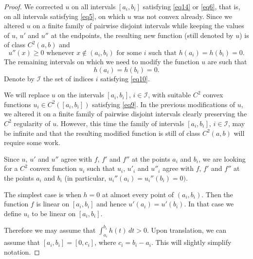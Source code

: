 \documentclass[intlimits,12pt,reqno]{amsart}
\theoremstyle{definition}
\begin{document}
\begin{proof}
We corrected $u$ on all intervals $[a_i,b_i]$ satisfying \eqref{eq14} or \eqref{eq6}, that is, on all intervals satisfying \eqref{eq5}, on which $u$ was not convex already. Since we altered $u$ on a finite family of pairwise disjoint intervals while keeping the values of $u$, $u'$ and $u''$ at the endpoints, the resulting new function (still denoted by $u$) is of class $C^2(a,b)$ and
\begin{equation}
\label{eq20}
u''(x)\geq 0 \text{ whenever } x\not\in (a_i,b_i)
\text{ for some }  i \text{ such that } h(a_i)=h(b_i)=0.
\end{equation}
The remaining intervals on which we need to modify the function $u$ are such that
\begin{equation}
\label{eq10}
h(a_i)=h(b_i)=0.
\end{equation}
Denote by $\mathcal{I}$ the set of indices $i$ satisfying \eqref{eq10}.



We will replace $u$ on the intervals $[a_i,b_i]$, $i\in\mathcal{I}$, with suitable $C^2$ convex functions ${u_i\in C^2([a_i,b_i])}$ satisfying \eqref{eq9}.
In the previous modifications of $u$, we altered it on a finite family of pairwise disjoint intervals clearly preserving the $C^2$ regularity of $u$. However, this time the family of intervals $[a_i,b_i]$, $i\in\mathcal{I}$, may be infinite and that the resulting modified function is still of class $C^2(a,b)$ will require some work.

Since $u$, $u'$ and $u''$ agree with $f$, $f'$ and $f''$ at the points $a_i$ and $b_i$, we are looking for a $C^2$ convex function $u_i$ such that $u_i$, $u'_i$ and $u''_i$ agree with $f$, $f'$ and $f''$ at the points $a_i$ and $b_i$ (in particular, $u_i''(a_i)=u_i''(b_i)=0)$.

The simplest case is when $h=0$ at almost every point of $(a_i,b_i)$. Then the function $f$ is linear on $[a_i,b_i]$ and hence $u'(a_i)=u'(b_i)$. In that case we define $u_i$ to be linear on $[a_i,b_i]$.

Therefore we may assume that $\int_{a_i}^{b_i}h(t)\, dt>0$. Upon translation, we can assume that $[a_i,b_i]=[0,c_i]$, where $c_i=b_i-a_i$. This will slightly simplify notation.



\end{proof}
\end{document}

